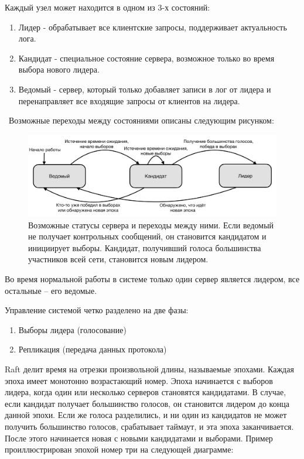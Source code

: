 \documentclass[subf, href, colorlinks=true, 14pt,
times, mtpro, specialist]{disser}
\theoremstyle{definition}
\begin{document}
Каждый узел может находится в одном из 3-х состояний:
\begin{enumerate}[noitemsep,topsep=-5pt,parsep=-5pt,partopsep=-5pt]
\item Лидер - обрабатывает все клиентские запросы, поддерживает актуальность лога.
\item Кандидат - специальное состояние сервера, возможное только во время выбора нового лидера.
\item Ведомый - сервер, который только добавляет записи в лог от лидера и перенаправляет все входящие запросы от клиентов на лидера.\
\end{enumerate}
\
Возможные переходы между состояниями описаны следующим рисунком:
\begin{figure}[H]
\centering
\includegraphics[width=1\textwidth]{src/pics/states.png}
\caption{Возможные статусы сервера и переходы между ними. Если ведомый не получает контрольных сообщений, он становится кандидатом и инициирует выборы. Кандидат, получивший голоса большинства участников всей сети, становится новым лидером.}
\label{fig:states}
\end{figure}

Во время нормальной работы в системе только один сервер является лидером, все остальные – его ведомые.

Управление системой четко разделено на две фазы:
\begin{enumerate}
\item Выборы лидера (голосование)
\item Репликация (передача данных протокола)
\end{enumerate}

Raft делит время на отрезки произвольной длины, называемые эпохами. Каждая эпоха имеет монотонно возрастающий номер. Эпоха начинается с выборов лидера, когда один или несколько серверов становятся кандидатами. В случае, если кандидат получает большинство голосов, он становится лидером до конца данной эпохи. Если же голоса разделились, и ни один из кандидатов не может получить большинство голосов, срабатывает таймаут, и эта эпоха заканчивается. После этого начинается новая с новыми кандидатами и выборами. Пример проиллюстрирован эпохой номер три на следующей диаграмме:
\end{document}
